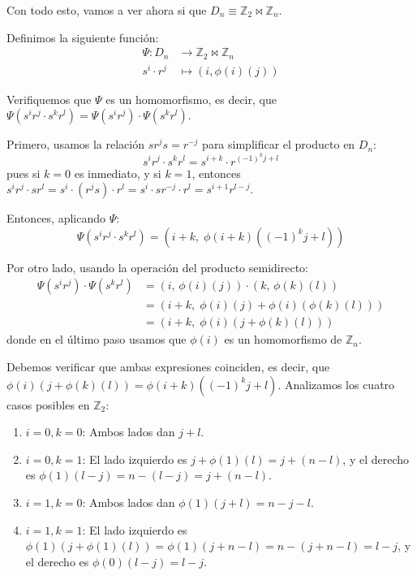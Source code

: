 \documentclass{article}
\begin{document}
      Con todo esto, vamos a ver ahora si que $D_n \equiv \mathbb{Z}_2 \Join \mathbb{Z}_n$.

      Definimos la siguiente función:
      \begin{equation*}
        \begin{aligned}
          \Psi: D_n &\to \mathbb{Z}_2 \Join \mathbb{Z}_n \\
          s^i \cdot r^j &\mapsto (i, \phi(i)(j))
        \end{aligned}
      \end{equation*}

      Verifiquemos que $\Psi$ es un homomorfismo, es decir, que 
      $\Psi(s^i r^j \cdot s^k r^l) = \Psi(s^i r^j) \cdot \Psi(s^k r^l)$.

      Primero, usamos la relación $sr^j s = r^{-j}$ para simplificar el producto en $D_n$:
      \[
        s^i r^j \cdot s^k r^l = s^{i+k} \cdot r^{(-1)^k j + l}
      \]
      pues si $k = 0$ es inmediato, y si $k = 1$, entonces 
      $s^i r^j \cdot s r^l = s^i \cdot (r^j s) \cdot r^l = s^i \cdot s r^{-j} \cdot r^l = s^{i+1} r^{l - j}$.

      Entonces, aplicando $\Psi$:
      \[
        \Psi(s^i r^j \cdot s^k r^l) = \left(i + k,\; \phi(i+k)\!\left((-1)^k j + l\right)\right)
      \]

      Por otro lado, usando la operación del producto semidirecto:
      \[
        \begin{aligned}
          \Psi(s^i r^j) \cdot \Psi(s^k r^l) 
          &= (i,\, \phi(i)(j)) \cdot (k,\, \phi(k)(l)) \\
          &= \left(i + k,\; \phi(i)(j) + \phi(i)(\phi(k)(l))\right) \\
          &= \left(i + k,\; \phi(i)\!\left(j + \phi(k)(l)\right)\right)
        \end{aligned}
      \]
      donde en el último paso usamos que $\phi(i)$ es un homomorfismo de $\mathbb{Z}_n$.

      Debemos verificar que ambas expresiones coinciden, es decir, que 
      $\phi(i)(j + \phi(k)(l)) = \phi(i+k)((-1)^k j + l)$.
      Analizamos los cuatro casos posibles en $\mathbb{Z}_2$:

      \begin{enumerate}[label=(\alph*)]
        \item $i = 0, k = 0$: Ambos lados dan $j + l$.
        \item $i = 0, k = 1$: El lado izquierdo es $j + \phi(1)(l) = j + (n - l)$, y el derecho es 
              $\phi(1)(l - j) = n - (l - j) = j + (n - l)$.
        \item $i = 1, k = 0$: Ambos lados dan $\phi(1)(j + l) = n - j - l$. 
        \item $i = 1, k = 1$: El lado izquierdo es $\phi(1)(j + \phi(1)(l)) = \phi(1)(j + n - l) = n - (j + n - l) = l - j$, 
              y el derecho es $\phi(0)(l - j) = l - j$.
      \end{enumerate}
\end{document}
